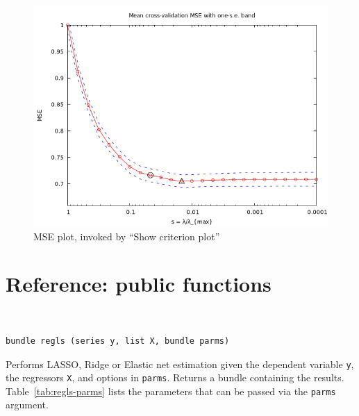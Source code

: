 \documentclass{article}
\newenvironment{funcdoc}
{\noindent\hrulefill\\[-12pt]}
{\medbreak}
\begin{document}
\begin{figure}[htbp]
  \begin{center}
  \includegraphics[scale=0.5]{mse_plot}
  \caption{MSE plot, invoked by ``Show criterion plot''}
  \label{fig:mse-plot}
  \end{center}
\end{figure}

\section{Reference: public functions}
\label{sec:funcref}

\begin{funcdoc}
\begin{verbatim}
bundle regls (series y, list X, bundle parms)
\end{verbatim}
  Performs LASSO, Ridge or Elastic net estimation given the dependent
  variable \texttt{y}, the regressors \texttt{X}, and options in
  \texttt{parms}. Returns a bundle containing the
  results. Table~\ref{tab:regls-parms} lists the parameters that can
  be passed via the \texttt{parms} argument.
\end{funcdoc}
\end{document}
